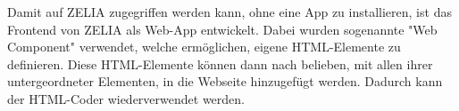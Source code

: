 
Damit auf ZELIA zugegriffen werden kann, ohne eine App zu installieren, ist das Frontend von ZELIA als Web-App entwickelt. Dabei wurden sogenannte "Web Component" verwendet, welche ermöglichen, eigene HTML-Elemente zu definieren. Diese HTML-Elemente können dann nach belieben, mit allen ihrer untergeordneter Elementen, in die Webseite hinzugefügt werden. Dadurch kann der HTML-Coder wiederverwendet werden.


\pagebreak
